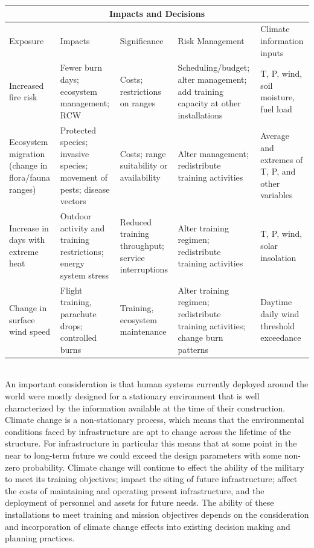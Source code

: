 \documentclass[10pt]{amsart}
\begin{document}
\begin{center}
\begin{tabular}{ |p{2.5cm}|p{2.5cm}|p{2.5cm}|p{2.5cm}|p{2.5cm}| }
\hline
\multicolumn{5}{|c|}{Impacts and Decisions} \\
\hline
Exposure & Impacts & Significance & Risk Management & Climate information inputs \\
\hline
Increased fire risk & Fewer burn days; ecosystem management; RCW & Costs; restrictions on ranges & Scheduling/budget; alter management; add training capacity at other installations & T, P, wind, soil moisture, fuel load \\
\hline
Ecosystem migration (change in flora/fauna ranges) & Protected species; invasive species; movement of pests; disease vectors & Costs; range suitability or availability & Alter management; redistribute training activities & Average and extremes of T, P, and other variables \\
\hline
Increase in days with extreme heat & Outdoor activity and training restrictions; energy system stress & Reduced training throughput; service interruptions & Alter training regimen; redistribute training activities & T, P, wind, solar insolation \\
\hline
Change in surface wind speed & Flight training, parachute drops; controlled burns & Training, ecosystem maintenance & Alter training regimen; redistribute training activities; change burn patterns & Daytime daily wind threshold exceedance \\
\hline 
\end{tabular}
\end{center}

\\

An important consideration is that human systems currently deployed around the world were mostly designed for a stationary environment that is well characterized by the information available at the time of their construction.
Climate change is a non-stationary process, which means that the environmental conditions faced by infrastructure are apt to change across the lifetime of the structure. 
For infrastructure in particular this means that at some point in the near to long-term future we could exceed the design parameters with some non-zero probability.
Climate change will continue to effect the ability of the military to meet its training objectives; impact the siting of future infrastructure; affect the costs of maintaining and operating present infrastructure, and the deployment of personnel and assets for future needs.
The ability of these installations to meet training and mission objectives depends on the consideration and incorporation of climate change effects into existing decision making and planning practices. 
\end{document}

